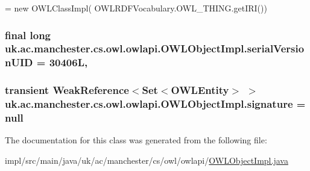 \begin{DoxyCode}
= \textcolor{keyword}{new} OWLClassImpl(
            OWLRDFVocabulary.OWL\_THING.getIRI())
\end{DoxyCode}
\hypertarget{classuk_1_1ac_1_1manchester_1_1cs_1_1owl_1_1owlapi_1_1_o_w_l_object_impl_a72b26db845c44c7e0b1f46f573a62a76}{
\subsubsection[{serial\-Version\-U\-I\-D}]{\setlength{\rightskip}{0pt plus 5cm}final long uk.\-ac.\-manchester.\-cs.\-owl.\-owlapi.\-O\-W\-L\-Object\-Impl.\-serial\-Version\-U\-I\-D = 30406\-L\hspace{0.3cm}{\ttfamily [static]}, {\ttfamily [private]}}}\label{classuk_1_1ac_1_1manchester_1_1cs_1_1owl_1_1owlapi_1_1_o_w_l_object_impl_a72b26db845c44c7e0b1f46f573a62a76}
\hypertarget{classuk_1_1ac_1_1manchester_1_1cs_1_1owl_1_1owlapi_1_1_o_w_l_object_impl_a80d2b1d9872ff1d62f9f15e017b88331}{
\subsubsection[{signature}]{\setlength{\rightskip}{0pt plus 5cm}transient Weak\-Reference$<$Set$<${\bf O\-W\-L\-Entity}$>$ $>$ uk.\-ac.\-manchester.\-cs.\-owl.\-owlapi.\-O\-W\-L\-Object\-Impl.\-signature = null\hspace{0.3cm}{\ttfamily [private]}}}\label{classuk_1_1ac_1_1manchester_1_1cs_1_1owl_1_1owlapi_1_1_o_w_l_object_impl_a80d2b1d9872ff1d62f9f15e017b88331}


The documentation for this class was generated from the following file\-:\begin{DoxyCompactItemize}
\item 
impl/src/main/java/uk/ac/manchester/cs/owl/owlapi/\hyperlink{_o_w_l_object_impl_8java}{O\-W\-L\-Object\-Impl.\-java}\end{DoxyCompactItemize}
